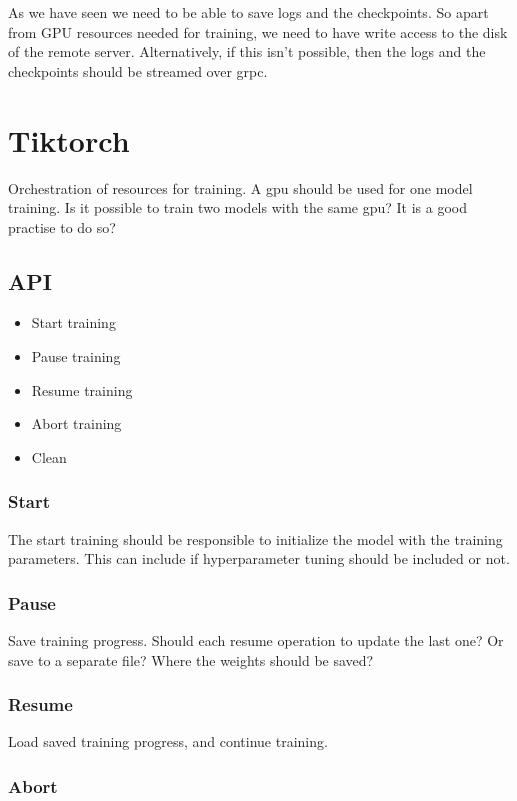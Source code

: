 \documentclass[12pt, a4paper]{article}
\begin{document}
As we have seen we need to be able to save logs and the checkpoints. So apart from GPU resources needed for training, we need to have write access to the disk of the remote server. Alternatively, if this isn't possible, then the logs and the checkpoints should be streamed over grpc.

\section{Tiktorch}

Orchestration of resources for training. A gpu should be used for one model training. Is it possible to train two models with the same gpu? It is a good practise to do so?

\subsection{API}

\begin{itemize}
    \item Start training
    \item Pause training
    \item Resume training
    \item Abort training
    \item Clean
\end{itemize}

\subsubsection{Start}

The start training should be responsible to initialize the model with the training parameters. This can include if hyperparameter tuning should be included or not.

\subsubsection{Pause}

Save training progress. Should each resume operation to update the last one? Or save to a separate file? Where the weights should be saved?

\subsubsection{Resume}

Load saved training progress, and continue training. 

\subsubsection{Abort}
\end{document}
